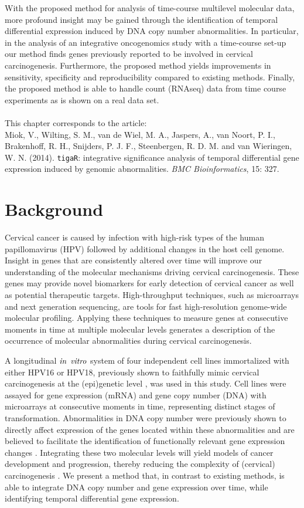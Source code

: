 With the proposed method for analysis of time-course multilevel molecular data, more profound insight may be gained through the identification of temporal differential expression induced by DNA copy number abnormalities. In particular, in the analysis of an integrative oncogenomics study with a time-course set-up our method finds genes previously reported to be involved in cervical carcinogenesis. Furthermore, the proposed method yields improvements in sensitivity, specificity and reproducibility compared to existing methods. Finally, the proposed method is able to handle count (RNAseq) data from time course experiments as is shown on a real data set.
\\
\\
This chapter corresponds to the article:\\
Miok, V., Wilting, S. M., van de Wiel, M. A., Jaspers, A., van Noort, P. I., Brakenhoff, R. H., Snijders, P. J. F., Steenbergen, R. D. M. and van Wieringen, W. N. (2014). {\tt tigaR}: integrative significance analysis of temporal differential gene expression induced by genomic abnormalities. \textit{BMC Bioinformatics}, 15: 327.

\section{Background}
Cervical cancer is caused by infection with high-risk types of the human papillomavirus (HPV) followed by additional changes in the host cell genome. Insight in genes that are consistently altered over time will improve our understanding of the molecular mechanisms driving cervical carcinogenesis. These genes may provide novel biomarkers for early detection of cervical cancer as well as potential therapeutic targets. High-throughput techniques, such as microarrays and next generation sequencing, are tools for fast high-resolution genome-wide molecular profiling. Applying these techniques to measure genes at consecutive moments in time at multiple molecular levels generates a description of the occurrence of molecular abnormalities during cervical carcinogenesis.

A longitudinal $\it{in}$ $\it{vitro}$ system of four independent cell lines immortalized with either HPV16 or HPV18, previously shown to faithfully mimic cervical carcinogenesis at the (epi)genetic level \cite{Steenbergen2004, Wilting2006, Henken2007}, was used in this study. Cell lines were assayed for gene expression (mRNA) and gene copy number (DNA) with microarrays at consecutive moments in time, representing distinct stages of transformation. Abnormalities in DNA copy number were previously shown to directly affect expression of the genes located within these abnormalities and are believed to facilitate the identification of functionally relevant gene expression changes \cite{Vogelstein2004}. Integrating these two molecular levels will yield models of cancer development and progression, thereby reducing the complexity of (cervical) carcinogenesis \cite{Hanash2004}. We present a method that, in contrast to existing methods, is able to integrate DNA copy number and gene expression over time, while identifying temporal differential gene expression.


